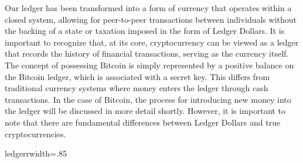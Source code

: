 Our ledger has been transformed into a form of currency that operates within a closed system, allowing for peer-to-peer
transactions between individuals without the backing of a state or taxation imposed in the form of Ledger Dollars. It is
important to recognize that, at its core, cryptocurrency can be viewed as a ledger that records the history of financial
transactions, serving as the currency itself. The concept of possessing Bitcoin is simply represented by a positive balance
on the Bitcoin ledger, which is associated with a secret key. This differs from traditional currency systems where money
enters the ledger through cash transactions. In the case of Bitcoin, the process for introducing new money into the ledger
will be discussed in more detail shortly. However, it is important to note that there are fundamental differences between
Ledger Dollars and true cryptocurrencies.

{ledgerr}{width=.85\textwidth}%
